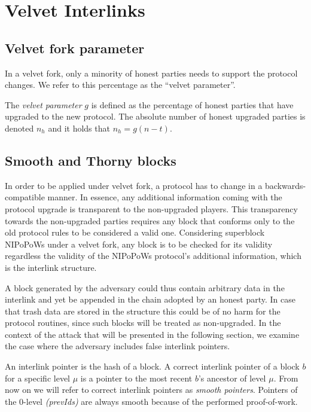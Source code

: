 \section{Velvet Interlinks}
\subsection{Velvet fork parameter}
In a velvet fork, only a minority of honest parties needs to support the protocol
changes. We refer to this percentage as the ``velvet parameter''.

\begin{definition}
	The \emph{velvet parameter} $g$ is defined as the percentage of honest parties
	that have upgraded to the new protocol. The absolute number of honest upgraded
	parties is denoted $n_h$ and it holds that
	$n_h = g (n - t)$.
	\label{defn:velvet_honest_majority}
\end{definition}

\subsection{Smooth and Thorny blocks}
In order to be applied under velvet fork, a protocol has to change in a backwards-compatible manner. In essence, any additional information coming with the protocol upgrade is transparent to the non-upgraded players. This transparency towards the non-upgraded parties requires any block that conforms only to the old protocol rules to be considered a valid one. Considering superblock NIPoPoWs under a velvet fork, any block is to be checked for its validity regardless the validity of the NIPoPoWs protocol's additional information, which is the interlink structure.

A block generated by the adversary could thus contain arbitrary data in the interlink and yet be appended in the chain adopted by an honest party. In case that trash data are stored in the structure this could be of no harm for the protocol routines, since such blocks will be treated as non-upgraded. In the context of the attack that will be presented in the following section, we examine the case where the adversary includes false interlink pointers.

An interlink pointer is the hash of a block. A correct interlink pointer of a block $b$ for a specific level $\mu$ is a pointer to the most recent $b$'s ancestor of level $\mu$. From now on we will refer to correct interlink pointers as \emph{smooth pointers}. Pointers of the 0-level \textit{(prevIds)} are always smooth because of the performed proof-of-work.

